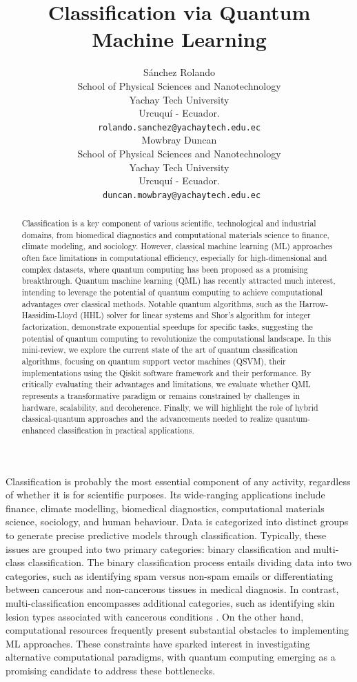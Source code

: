 \documentclass{article}
\title{Classification via Quantum Machine Learning} %
\author{
 Sánchez Rolando \\
 School of Physical Sciences and Nanotechnology\\
 Yachay Tech University\\
 Urcuquí - Ecuador. \\
 \texttt{rolando.sanchez@yachaytech.edu.ec} \\
 \And
 Mowbray Duncan \\
 School of Physical Sciences and Nanotechnology\\
 Yachay Tech University\\
 Urcuquí - Ecuador. \\
 \texttt{	duncan.mowbray@yachaytech.edu.ec} \\
}
\begin{document}
\maketitle
\begin{abstract}
Classification is a key component of various scientific, technological and industrial domains, from biomedical diagnostics and computational materials science to finance, climate modeling, and sociology. However, classical machine learning (ML) approaches often face limitations in computational efficiency, especially for high-dimensional and complex datasets, where quantum computing has been proposed as a promising breakthrough. Quantum machine learning (QML) has recently attracted much interest, intending to leverage the potential of quantum computing to achieve computational advantages over classical methods. Notable quantum algorithms, such as the Harrow-Hassidim-Lloyd (HHL) solver for linear systems and Shor's algorithm for integer factorization, demonstrate exponential speedups for specific tasks, suggesting the potential of quantum computing to revolutionize the computational landscape. In this mini-review, we explore the current state of the art of quantum classification algorithms, focusing on quantum support vector machines (QSVM), their implementations using the Qiskit software framework and their performance. By critically evaluating their advantages and limitations, we evaluate whether QML represents a transformative paradigm or remains constrained by challenges in hardware, scalability, and decoherence. Finally, we will highlight the role of hybrid classical-quantum approaches and the advancements needed to realize quantum-enhanced classification in practical applications.
\end{abstract}


Classification is probably the most essential component of any activity, regardless of whether it is for scientific purposes. Its wide-ranging applications include finance, climate modelling, biomedical diagnostics, computational materials science, sociology, and human behaviour. Data is categorized into distinct groups to generate precise predictive models through classification. Typically, these issues are grouped into two primary categories: binary classification and multi-class classification. The binary classification process entails dividing data into two categories, such as identifying spam versus non-spam emails or differentiating between cancerous and non-cancerous tissues in medical diagnosis.
In contrast, multi-classification encompasses additional categories, such as identifying skin lesion types associated with cancerous conditions \cite{skin}. On the other hand, computational resources frequently present substantial obstacles to implementing ML approaches. These constraints have sparked interest in investigating alternative computational paradigms, with quantum computing emerging as a promising candidate to address these bottlenecks.
\end{document}
